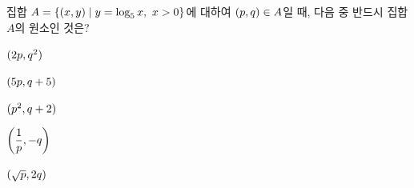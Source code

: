 집합 $A=\{(x{,}\mkern3mu\mathopen{}y) \mid y=\log_5 x,\ x>0\}$에 대하여 $(p{,}\mkern3mu\mathopen{}q)\in A$일 때, 다음 중 반드시 집합 $A$의 원소인 것은?
\begin{choices32}{\rule[-3ex]{0pt}{8ex}$(2p{,}\mkern3mu\mathopen{}q^2)$}{\rule[-3ex]{0pt}{8ex}$(5p{,}\mkern3mu\mathopen{}q+5)$}{\rule[-3ex]{0pt}{8ex}$(p^2{,}\mkern3mu\mathopen{}q+2)$}{\rule[-3ex]{0pt}{8ex}$\left(\dfrac{1}{p}{,}\mkern3mu\mathopen{}-q\right)$}{\rule[-3ex]{0pt}{8ex}$(\sqrt{p}{,}\mkern3mu\mathopen{}2q)$}\end{choices32}

